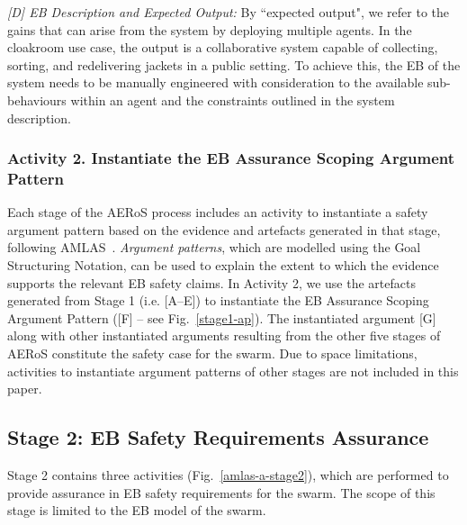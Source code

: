 \documentclass[runningheads]{llncs}
\begin{document}
\vspace{-1ex}
\emph{[D] EB Description and Expected Output:}
By ``expected output", we refer to the gains that can arise from the system by deploying multiple agents. 
In the cloakroom use case, the output is a collaborative system capable of collecting, sorting, and redelivering jackets in a public setting. 
To achieve this, the EB of the system needs to be manually engineered with consideration to the available sub-behaviours within an agent and the constraints outlined in the system description.

\vspace{-2ex}
\subsubsection*{Activity 2. Instantiate the EB Assurance Scoping Argument Pattern}
Each stage of the AERoS process includes an activity to instantiate a safety argument pattern based on the evidence and artefacts generated in that stage, following AMLAS~\cite{Hawkins2021}. 
\textit{Argument patterns}, which are modelled using the Goal Structuring Notation, can be used to explain the extent to which the evidence supports the relevant EB safety claims.  
In Activity 2, we use the artefacts generated from Stage 1 (i.e. [A–E]) to instantiate the EB Assurance Scoping Argument Pattern ([F] – see Fig.~\ref{stage1-ap}). 
The instantiated argument [G] along with other instantiated arguments resulting from the other five stages of AERoS constitute the safety case for the swarm. 
Due to space limitations, activities to instantiate argument patterns of other stages are not included in this paper.

\vspace{-2ex}
\subsection{Stage 2: EB Safety Requirements Assurance} \label{framework-stage2}
Stage 2 contains three activities (Fig.~\ref{amlas-a-stage2}), which are performed to provide assurance in EB safety requirements for the swarm. 
The scope of this stage is limited to the EB model of the swarm.
\end{document}
